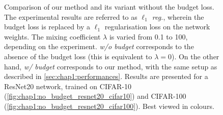 \begin{figure}
  \centering
    \caption{ Comparison of our method and its variant without the budget loss.
    The experimental results are referred to as \emph{$\ell_1$ reg.}, wherein
    the budget loss is replaced by a $\ell_1$ regularisation loss on the network
    weights. The mixing coefficient $\lambda$ is varied from 0.1 to 100,
    depending on the experiment. \emph{w/o budget} corresponds to the absence of
    the budget loss (this is equivalent to $\lambda = 0$). On the other hand,
    \emph{w/ budget} corresponds to our method, with the same setup as described
    in \cref{sec:chap1:performances}. Results are presented for a ResNet20
    network, trained on CIFAR-10 (\cref{fig:chap1:no_budget_resnet20_cifar10})
    and CIFAR-100 (\cref{fig:chap1:no_budget_resnet20_cifar100}). Best viewed in
    colours.}
  \label{fig:chap1:no_budget_resnet20}
\end{figure}




